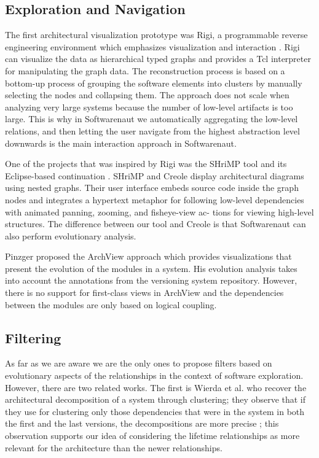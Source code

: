 \documentclass[preprint,12pt]{elsarticle}
\begin{document}
\subsection {Exploration and Navigation} 

The first architectural visualization prototype was Rigi, a programmable reverse engineering environment which emphasizes visualization and interaction \cite{muller-revengenv}. Rigi can visualize the data as hierarchical typed graphs and provides a Tcl interpreter for manipulating the graph data. The reconstruction process is based on a bottom-up process of grouping the software elements into clusters by manually selecting the nodes and collapsing them. The approach does not scale when analyzing very large systems because the number of low-level artifacts is too large. This is why in Softwarenaut we automatically aggregating the low-level relations, and then letting the user navigate from the highest abstraction level downwards is the main interaction approach in Softwarenaut. 

One of the projects that was inspired by Rigi was the SHriMP tool \cite{storey-shrimp} and its Eclipse-based continuation \cite{lintern-creole}. SHriMP and Creole display architectural diagrams using nested graphs. Their user interface embeds source code inside the graph nodes and integrates a hypertext metaphor for following low-level dependencies with animated panning, zooming, and fisheye-view ac- tions for viewing high-level structures.
The difference between our tool and Creole is that Softwarenaut can also perform evolutionary analysis.

Pinzger proposed the ArchView approach \cite{pinzger-thesis} which provides visualizations that present the evolution of the modules in a system. His evolution analysis takes into account the annotations from the versioning system repository. However, there is no support for first-class views in ArchView and the dependencies between the modules are only based on logical coupling. 


\subsection {Filtering}
 

As far as we are aware we are the only ones to propose filters based on evolutionary aspects of the relationships in the context of software exploration. However, there are two related works. The first is Wierda et al. who recover the architectural decomposition of a system through clustering; they observe that if they use for clustering only those dependencies that were in the system in both the first and the last versions, the decompositions are more precise \cite{wierda-clustering}; this observation supports our idea of considering the lifetime relationships as more relevant for the architecture than the newer relationships. 
\end{document}
